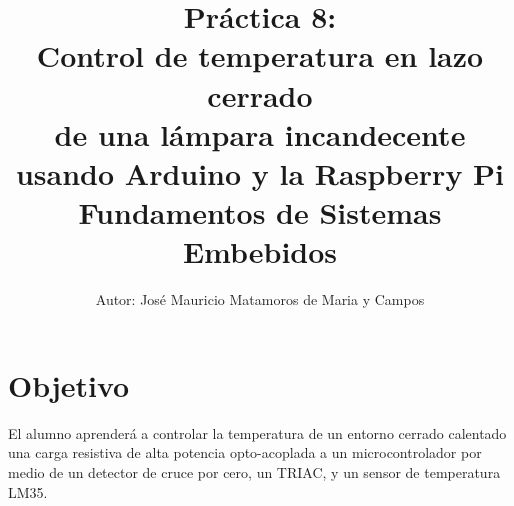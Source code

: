\documentclass[letterpaper,10.5pt]{article}
\author{\footnotesize Autor: José Mauricio Matamoros de Maria y Campos}
\title{Práctica 8:\\Control de temperatura en lazo cerrado\\de una lámpara incandecente\\usando Arduino y la Raspberry Pi\\
{\large Fundamentos de Sistemas Embebidos}}
\date{}
\begin{document}
\maketitle

\section{Objetivo}%
\label{sec:objective}
El alumno aprenderá a controlar la temperatura de un entorno cerrado calentado una carga resistiva de alta potencia opto-acoplada a un microcontrolador por medio de un detector de cruce por cero, un TRIAC, y un sensor de temperatura LM35.




\cleardoublepage



\appendix


\end{document}
